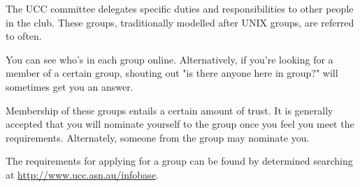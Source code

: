 
\newenvironment{uccgroup}[1]
{
	\begin{mdframed}[nobreak=true]
	\section{\textsc{#1}}
	\begin{mdframed}
		Contact: <\href{mailto:#1@ucc.asn.au}{#1@ucc.asn.au}>
	\end{mdframed}
	\begin{mdframed}
		Members: \small{\url{http://www.ucc.asn.au/infobase/groups/#1.ucc}}
	\end{mdframed}

	

}{\end{mdframed}}

\begin{mdframed}
\null
The UCC committee delegates specific duties and responsibilities to other people in the club. These groups, traditionally modelled after UNIX groups, are referred to often.

You can see who's in each group online. Alternatively, if you're looking for a member of a certain group, shouting out "is there anyone here in group?" will sometimes get you an answer.


Membership of these groups entails a certain amount of trust. It is generally accepted that you will nominate yourself to the group once you feel you meet the requirements. Alternately, someone from the group may nominate you.

The requirements for applying for a group can be found by determined searching at \url{http://www.ucc.asn.au/infobase}.



\end{mdframed}

